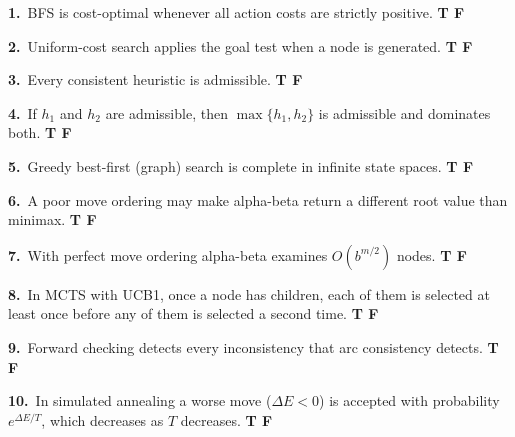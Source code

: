 \documentclass[11pt,a4paper]{article}
\newcommand{\subq}[1]{\par\smallskip\noindent\textbf{#1}\ }
\begin{document}
\subq{1.}BFS is cost-optimal whenever all action costs are strictly positive. \hfill \textbf{T \quad F}
\begin{ansbox}[height=1.5cm]\end{ansbox}
\subq{2.}Uniform-cost search applies the goal test when a node is generated. \hfill \textbf{T \quad F}
\begin{ansbox}[height=1.5cm]\end{ansbox}
\subq{3.}Every consistent heuristic is admissible. \hfill \textbf{T \quad F}
\begin{ansbox}[height=1.5cm]\end{ansbox}
\subq{4.}If $h_1$ and $h_2$ are admissible, then $\max\{h_1,h_2\}$ is admissible and dominates both. \hfill \textbf{T \quad F}
\begin{ansbox}[height=1.5cm]\end{ansbox}
\subq{5.}Greedy best-first (graph) search is complete in infinite state spaces. \hfill \textbf{T \quad F}
\begin{ansbox}[height=1.5cm]\end{ansbox}
\subq{6.}A poor move ordering may make alpha-beta return a different root value than minimax. \hfill \textbf{T \quad F}
\begin{ansbox}[height=1.5cm]\end{ansbox}
\subq{7.}With perfect move ordering alpha-beta examines $O(b^{m/2})$ nodes. \hfill \textbf{T \quad F}
\begin{ansbox}[height=1.5cm]\end{ansbox}
\subq{8.}In MCTS with UCB1, once a node has children, each of them is selected at least once before any of them is selected a second time. \hfill \textbf{T \quad F}
\begin{ansbox}[height=1.5cm]\end{ansbox}
\subq{9.}Forward checking detects every inconsistency that arc consistency detects. \hfill \textbf{T \quad F}
\begin{ansbox}[height=1.5cm]\end{ansbox}
\subq{10.}In simulated annealing a worse move ($\Delta E<0$) is accepted with probability $e^{\Delta E/T}$, which decreases as $T$ decreases. \hfill \textbf{T \quad F}
\begin{ansbox}[height=1.5cm]\end{ansbox}
\end{document}

